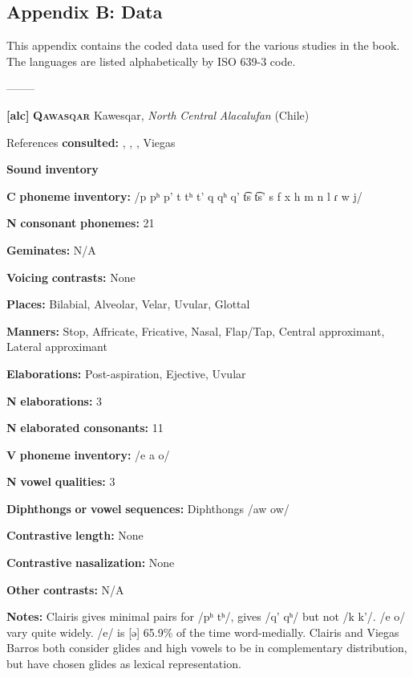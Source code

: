 
\subsection{Appendix B: Data} 
This appendix contains the coded data used for the various studies in the book. The languages are listed alphabetically by ISO 639-3 code.

--------

\textbf{[alc]}   \textbf{\textsc{Qawasqar}}  Kawesqar, \textit{North} \textit{Central} \textit{Alacalufan} (Chile)

References \textbf{consulted:} \citet{Aguilera2001}, \citet{Clairis1977}, \citet{Clairis1985}, Viegas \citet{Barros1990}

\textbf{Sound} \textbf{inventory}

\textbf{C} \textbf{phoneme} \textbf{inventory:} /p pʰ p’ t tʰ t’ q qʰ q’ t͡s t͡s’ s f x h m n l ɾ w j/

\textbf{N} \textbf{consonant} \textbf{phonemes:} 21

\textbf{Geminates:} N/A

\textbf{Voicing} \textbf{contrasts:} None

\textbf{Places:} Bilabial, Alveolar, Velar, Uvular, Glottal

\textbf{Manners:} Stop, Affricate, Fricative, Nasal, Flap/Tap, Central approximant, Lateral approximant

\textbf{Elaborations:} Post-aspiration, Ejective, Uvular

\textbf{N} \textbf{elaborations:} 3

\textbf{N} \textbf{elaborated} \textbf{consonants:} 11

\textbf{V} \textbf{phoneme} \textbf{inventory:} /e a o/

\textbf{N} \textbf{vowel} \textbf{qualities:} 3

\textbf{Diphthongs} \textbf{or} \textbf{vowel} \textbf{sequences:} Diphthongs /aw ow/

\textbf{Contrastive} \textbf{length:} None

\textbf{Contrastive} \textbf{nasalization:} None

\textbf{Other} \textbf{contrasts:} N/A

\textbf{Notes:} Clairis gives minimal pairs for /pʰ tʰ/, gives /q’ qʰ/ but not /k k’/. /e o/ vary quite widely. /e/ is [ə] 65.9\% of the time word-medially. Clairis and Viegas Barros both consider glides and high vowels to be in complementary distribution, but have chosen glides as lexical representation.

